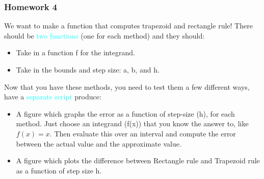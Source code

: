 \documentclass{beamer}
\begin{document}
\begin{frame}
\frametitle{Homework 4}

We want to make a function that computes trapezoid and rectangle rule! There should be \textcolor{cyan}{two functions} (one for each method) and they should: 

\begin{itemize}
\item Take in a function f for the integrand. 
\item Take in the bounds and step size: a, b, and h. 
\end{itemize}

Now that you have these methods, you need to test them a few different ways, have a \textcolor{cyan}{separate script} produce:

\begin{itemize}
\item A figure which graphs the error as a function of step-size (h), for each method. Just choose an integrand (f(x)) that you know the answer to, like $f(x)=x$. Then evaluate this over an interval and compute the error between the actual value and the approximate value. 
\item A figure which plots the difference between Rectangle rule and Trapezoid rule as a function of step size h. 
\end{itemize}

\end{frame}
%
%
%
%
%
\end{document}
